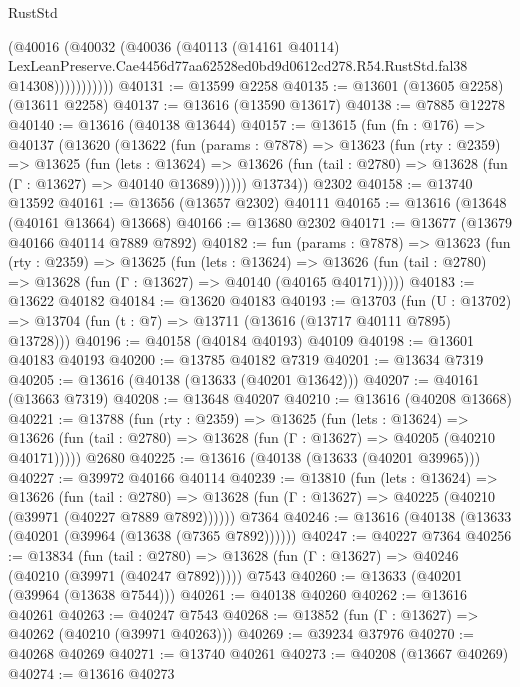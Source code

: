 \begin{lexlean}{RustStd}
\begin{coremodule}
                  (@40016
                    (@40032
                      (@40036
                        (@40113
                          (@14161 @40114)
                          LexLeanPreserve.Cae4456d77aa62528ed0bd9d0612cd278.R54.RustStd.fal38
                          @14308)))))))))))
@40131 := @13599 @2258
@40135 := @13601 (@13605 @2258) (@13611 @2258)
@40137 := @13616 (@13590 @13617)
@40138 := @7885 @12278
@40140 := @13616 (@40138 @13644)
@40157 := @13615
    (fun (fn : @176) =>
    @40137
      (@13620
        (@13622
          (fun (params : @7878) =>
          @13623
            (fun (rty : @2359) =>
            @13625
              (fun (lets : @13624) =>
              @13626 (fun (tail : @2780) => @13628 (fun (Γ : @13627) => @40140 @13689))))))
        @13734))
    @2302
@40158 := @13740 @13592
@40161 := @13656 (@13657 @2302) @40111
@40165 := @13616 (@13648 (@40161 @13664) @13668)
@40166 := @13680 @2302
@40171 := @13677 (@13679 @40166 @40114 @7889 @7892)
@40182 := fun (params : @7878) =>
  @13623
    (fun (rty : @2359) =>
    @13625
      (fun (lets : @13624) =>
      @13626 (fun (tail : @2780) => @13628 (fun (Γ : @13627) => @40140 (@40165 @40171)))))
@40183 := @13622 @40182
@40184 := @13620 @40183
@40193 := @13703
    (fun (U : @13702) => @13704 (fun (t : @7) => @13711 (@13616 (@13717 @40111 @7895) @13728)))
@40196 := @40158 (@40184 @40193) @40109
@40198 := @13601 @40183 @40193
@40200 := @13785 @40182 @7319
@40201 := @13634 @7319
@40205 := @13616 (@40138 (@13633 (@40201 @13642)))
@40207 := @40161 (@13663 @7319)
@40208 := @13648 @40207
@40210 := @13616 (@40208 @13668)
@40221 := @13788
    (fun (rty : @2359) =>
    @13625
      (fun (lets : @13624) =>
      @13626 (fun (tail : @2780) => @13628 (fun (Γ : @13627) => @40205 (@40210 @40171)))))
    @2680
@40225 := @13616 (@40138 (@13633 (@40201 @39965)))
@40227 := @39972 @40166 @40114
@40239 := @13810
    (fun (lets : @13624) =>
    @13626
      (fun (tail : @2780) =>
      @13628 (fun (Γ : @13627) => @40225 (@40210 (@39971 (@40227 @7889 @7892))))))
    @7364
@40246 := @13616 (@40138 (@13633 (@40201 (@39964 (@13638 (@7365 @7892))))))
@40247 := @40227 @7364
@40256 := @13834
    (fun (tail : @2780) => @13628 (fun (Γ : @13627) => @40246 (@40210 (@39971 (@40247 @7892)))))
    @7543
@40260 := @13633 (@40201 (@39964 (@13638 @7544)))
@40261 := @40138 @40260
@40262 := @13616 @40261
@40263 := @40247 @7543
@40268 := @13852 (fun (Γ : @13627) => @40262 (@40210 (@39971 @40263)))
@40269 := @39234 @37976
@40270 := @40268 @40269
@40271 := @13740 @40261
@40273 := @40208 (@13667 @40269)
@40274 := @13616 @40273

\end{coremodule}
\end{lexlean}
